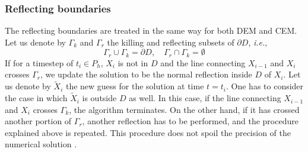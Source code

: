 \subsubsection{Reflecting boundaries}
The reflecting boundaries are treated in the same way for both DEM and CEM. Let us denote by $\Gamma_k$ and $\Gamma_r$ the killing and reflecting subsets of $\partial D$, \textit{i.e.},
\begin{equation}\label{eq:Boundaries}
	\Gamma_r \cup \Gamma_k = \partial D, \quad \Gamma_r \cap \Gamma_k = \emptyset
\end{equation} 
If for a timestep of $t_i \in P_h$, $X_i$ is not in $D$ and the line connecting $X_{i-1}$ and $X_i$ crosses $\Gamma_r$, we update the solution to be the normal reflection inside $D$ of $X_i$. Let us denote by $\tilde X_i$ the new guess for the solution at time $t = t_i$. One has to consider the case in which $\tilde X_i$ is outside $D$ as well. In this case, if the line connecting $X_{i-1}$ and $X_i$ crosses $\Gamma_k$, the algorithm terminates. On the other hand, if it has crossed another portion of $\Gamma_r$, another reflection has to be performed, and the procedure explained above is repeated. This procedure does not spoil the precision of the numerical solution \cite{Helmuth}.


